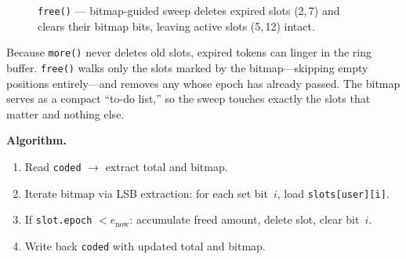 \documentclass[10pt,a4paper,twocolumn]{article}
\theoremstyle{definition}
\theoremstyle{plain}
\theoremstyle{remark}
\begin{document}
\begin{figure}[htbp]
\centering
{}
\caption{\texttt{free()} --- bitmap-guided sweep deletes expired slots (2,\,7) and clears their bitmap bits, leaving active slots (5,\,12) intact.}
\label{fig:free}
\end{figure}

Because \texttt{more()} never deletes old slots, expired tokens can linger in the ring buffer.  \texttt{free()} walks only the slots marked by the bitmap---skipping empty positions entirely---and removes any whose epoch has already passed.  The bitmap serves as a compact ``to-do list,'' so the sweep touches exactly the slots that matter and nothing else.

\textbf{Algorithm.}
\begin{enumerate}[leftmargin=*, nosep]
\item Read \texttt{coded} $\to$ extract total and bitmap.
\item Iterate bitmap via LSB extraction: for each set bit~$i$, load \texttt{slots[user][i]}.
\item If \texttt{slot.epoch} $< e_{\text{now}}$: accumulate freed amount, delete slot, clear bit~$i$.
\item Write back \texttt{coded} with updated total and bitmap.
\end{enumerate}
\end{document}
